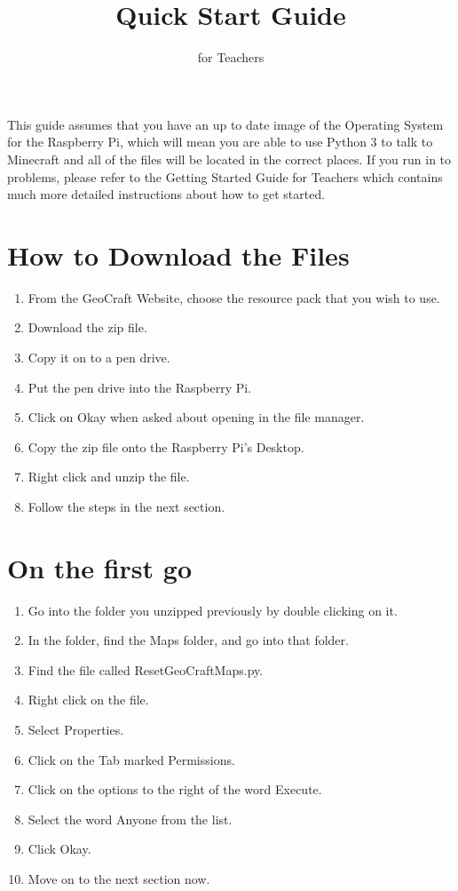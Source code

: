 \documentclass{geocraft-worksheet-multipage}
\begin{document}
\title{Quick Start Guide}
\subtitle{for Teachers}
\date{}

\maketitle

This guide assumes that you have an up to date image of the Operating
System for the Raspberry Pi, which will mean you are able to use
Python 3 to talk to Minecraft and all of the files will be located in
the correct places. If you run in to problems, please refer to the
Getting Started Guide for Teachers which contains much more detailed
instructions about how to get started. 

\section*{How to Download the Files}
\begin{enumerate}
\item From the GeoCraft Website, choose the resource pack that you wish to
use.
\item Download the zip file.
\item Copy it on to a pen drive.
\item Put the pen drive into the Raspberry Pi.
\item Click on Okay when asked about opening in the file manager.
\item Copy the zip file onto the Raspberry Pi's Desktop.
\item Right click and unzip the file.
\item Follow the steps in the next section.
\end{enumerate}

\section*{On the first go}
\begin{enumerate}
\item Go into the folder you unzipped previously by double clicking on
  it.
\item In the folder, find the Maps folder, and go into that folder.
\item Find the file called ResetGeoCraftMaps.py.
\item Right click on the file.
\item Select Properties.
\item Click on the Tab marked Permissions.
\item Click on the options to the right of the word Execute.
\item Select the word Anyone from the list.
\item Click Okay.
\item Move on to the next section now.
\end{enumerate}
\end{document}
